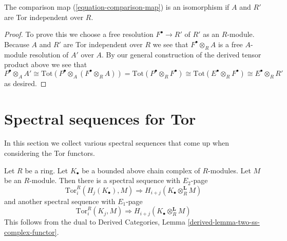 \begin{lemma}
\label{lemma-base-change-comparison}
The comparison map (\ref{equation-comparison-map}) is an isomorphism
if $A$ and $R'$ are Tor independent over $R$.
\end{lemma}

\begin{proof}
To prove this we choose a free resolution $F^\bullet \to R'$
of $R'$ as an $R$-module. Because $A$ and $R'$ are Tor independent over $R$
we see that $F^\bullet \otimes_R A$ is a free $A$-module resolution of $A'$
over $A$. By our general construction of the derived tensor product
above we see that
$$
P^\bullet \otimes_A A' \cong
\text{Tot}(P^\bullet \otimes_A (F^\bullet \otimes_R A)) =
\text{Tot}(P^\bullet \otimes_R F^\bullet) \cong
\text{Tot}(E^\bullet \otimes_R F^\bullet) \cong
E^\bullet \otimes_R R'
$$
as desired.
\end{proof}










\section{Spectral sequences for Tor}
\label{section-spectral-sequence-tor}


\noindent
In this section we collect various spectral sequences that come up
when considering the Tor functors.

\begin{example}
\label{example-cohomology-complex-tensored}
Let $R$ be a ring. Let $K_\bullet$ be a bounded above chain complex
of $R$-modules. Let $M$ be an $R$-module. Then there is a
spectral sequence with $E_2$-page
$$
\text{Tor}^R_i(H_j(K_\bullet), M)
\Rightarrow
H_{i + j}(K_\bullet \otimes^{\mathbf{L}}_R M)
$$
and another spectral sequence with $E_1$-page
$$
\text{Tor}^R_i(K_j, M)
\Rightarrow
H_{i + j}(K_\bullet \otimes^{\mathbf{L}}_R M)
$$
This follows from the dual to
Derived Categories, Lemma \ref{derived-lemma-two-ss-complex-functor}.
\end{example}


